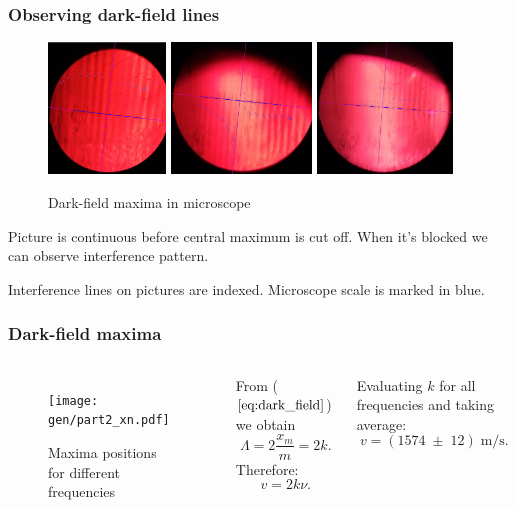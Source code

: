 \documentclass{beamer}
\begin{document}
	\begin{frame}
		\frametitle{Observing dark-field lines}
		
		\begin{figure}
			\includegraphics[height=3.5cm]{data/part2/1.jpg}
			\includegraphics[height=3.5cm]{data/part2/2.jpg}
			\includegraphics[height=3.5cm]{data/part2/3.jpg}
			\caption{Dark-field maxima in microscope}
		\end{figure}
		
		Picture is continuous before central maximum is cut off. When it's blocked we can observe interference pattern.
		
		Interference lines on pictures are indexed. Microscope scale is marked in blue.
		
	\end{frame}
	
	
	\begin{frame}
		\frametitle{Dark-field maxima}
		
		\begin{columns}
			\begin{figure}
				\texttt{[image: gen/part2\_xn.pdf]}
				\caption{Maxima positions for different frequencies}
			\end{figure}
			From ($\ref{eq:dark_field}$) we obtain
			$$\Lambda = 2 \frac{x_m}{m} = 2 k.$$
			Therefore:
			$$ v = 2 k \nu.$$
			
			
			Evaluating $k$ for all frequencies and taking average:
			$$ v = (1574 \;\pm \; 12) \; \text{m/s}. $$
			
		\end{columns}
	\end{frame}
\end{document}
